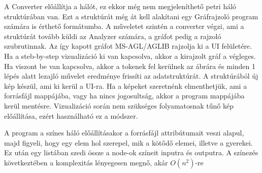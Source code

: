 A Converter előállítja a hálót, ez ekkor még nem megjeleníthető petri háló struktúrában van. Ezt a struktúrát még át kell alakítani egy Gráfrajzoló program számára is érthető formátumba. A műveletet szintén a converter végzi, ami a struktúrát tovább küldi az Analyzer számára, a gráfot pedig a rajzoló szubrutinnak. Az így kapott gráfot MS-AGL/AGLIB rajzolja ki a UI felületére. Ha a steb-by-step vizualizáció ki van kapcsolva, akkor a kirajzolt gráf a végleges. Ha viszont be van kapcsolva, akkor a tokenek fel kerülnek az ábrára és minden 1 lépés alatt lezajló művelet eredménye frissíti az adatstruktúrát. A struktúrából új kép készül, ami ki kerül a UI-ra. Ha a képeket szeretnénk elmenthetjük, ami a forrásfájl mappájába, vagy ha nincs jogosultság, akkor a program mappájába kerül mentésre. Vizualizáció során nem szükséges folyamatosnak tűnő kép előállítása, ezért használható ez a módszer. 

A program a színes háló előállításakor a forrásfájl attribútumait veszi alapul, majd figyeli, hogy egy elem hol szerepel, mik a kötődő elemei, illetve a gyerekei. Ez után egy listában szedi össze a node-ok színeit inputra és outputra. A színezés következtében a komplexitás lényegesen megnő, akár $O(n^2)$-re
